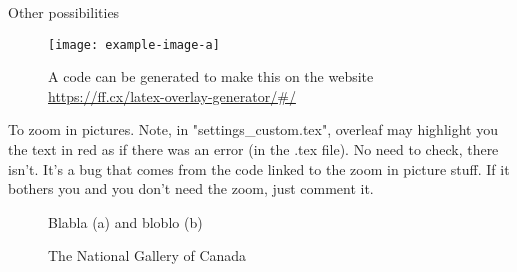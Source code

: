 \documentclass[../main.tex]{subfiles}
\begin{document}
\clearpage  
Other possibilities

\begin{figure}[h!t]
  \begin{annotatedFigure}
    {\texttt{[image: example-image-a]}}
  \end{annotatedFigure}

  \caption{A code can be generated to make this on the website\\ \href{https://ff.cx/latex-overlay-generator/\#/}{https://ff.cx/latex-overlay-generator/\#/}}
  \label{fig:teaser}
\end{figure}

\clearpage
To zoom in pictures. Note, in "settings\_custom.tex", overleaf may highlight you the text in red as if there was an error (in the .tex file). No need to check, there isn't. It's a bug that comes from the code linked to the zoom in picture stuff. If it bothers you and you don't need the zoom, just comment it.
\begin{figure}[h]
    \centering
    \caption{Blabla (a) and bloblo (b)}
    \label{fig_Vout_plateau}
\end{figure}

\begin{figure}[h]
    \centering
    \caption{The National Gallery of Canada}
\end{figure}
\end{document}
